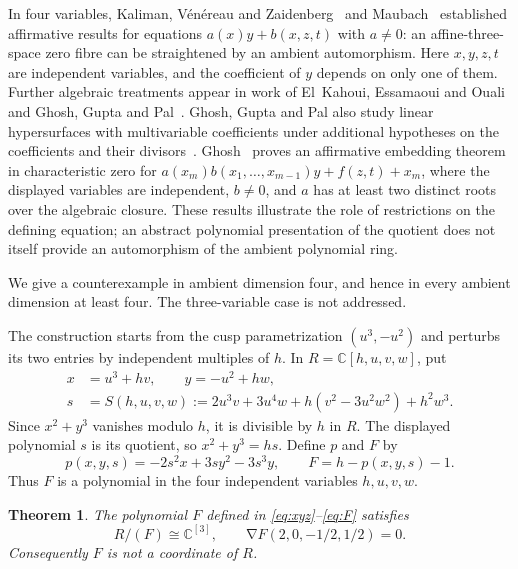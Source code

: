 \documentclass[11pt]{article}
\numberwithin{equation}{section}
\newtheorem{theorem}{Theorem}[section]
\newcommand{\CC}{\mathbb C}
\DeclareMathOperator{\grad}{\nabla}
\begin{document}
In four variables, Kaliman, V\'en\'ereau and Zaidenberg~\cite[Theorem~4.2(a)]{KVZ}
and Maubach~\cite[Corollaries~4.2--4.3]{Maubach} established affirmative results
for equations $a(x)y+b(x,z,t)$ with $a\ne0$: an affine-three-space zero fibre
can be straightened by an ambient automorphism. Here $x,y,z,t$ are independent
variables, and the coefficient of $y$ depends on only one of them.
Further algebraic treatments appear in work of El~Kahoui, Essamaoui and
Ouali~\cite{EEO} and Ghosh, Gupta and Pal~\cite{GGPthreefold}.
Ghosh, Gupta and Pal also study linear hypersurfaces with multivariable
coefficients under additional hypotheses on the coefficients and their
divisors~\cite[Theorem~4.11]{GGP}.
Ghosh~\cite[Theorem~1.4]{Ghosh} proves an affirmative embedding theorem in
characteristic zero for
$a(x_m)b(x_1,\ldots,x_{m-1})y+f(z,t)+x_m$, where the displayed variables are
independent, $b\ne0$, and $a$ has at least two distinct roots over the algebraic
closure.
These results illustrate the role of restrictions on the defining equation;
an abstract polynomial presentation of the quotient does not itself provide
an automorphism of the ambient polynomial ring.

We give a counterexample in ambient dimension four, and hence in every
ambient dimension at least four. The three-variable case is not addressed.

The construction starts from the cusp parametrization $(u^3,-u^2)$ and
perturbs its two entries by independent multiples of $h$.
In $R=\CC[h,u,v,w]$, put
\begin{equation}\label{eq:xyz}
  \begin{aligned}
    x&=u^3+hv,\qquad y=-u^2+hw,\\
    s&=S(h,u,v,w)
       :=2u^3v+3u^4w+h(v^2-3u^2w^2)+h^2w^3.
  \end{aligned}
\end{equation}
Since $x^2+y^3$ vanishes modulo $h$, it is divisible by $h$ in $R$.
The displayed polynomial $s$ is its quotient, so $x^2+y^3=hs$.
Define $p$ and $F$ by
\begin{equation}
  p(x,y,s)=-2s^2x+3sy^2-3s^3y,
  \qquad F=h-p(x,y,s)-1. \label{eq:F}
\end{equation}
Thus $F$ is a polynomial in the four independent variables $h,u,v,w$.

\begin{theorem}\label{thm:main}
The polynomial $F$ defined in \eqref{eq:xyz}--\eqref{eq:F} satisfies
\[
  R/(F)\cong\CC^{[3]},
  \qquad
  \grad F(2,0,-1/2,1/2)=0.
\]
Consequently $F$ is not a coordinate of $R$.
\end{theorem}
\end{document}
